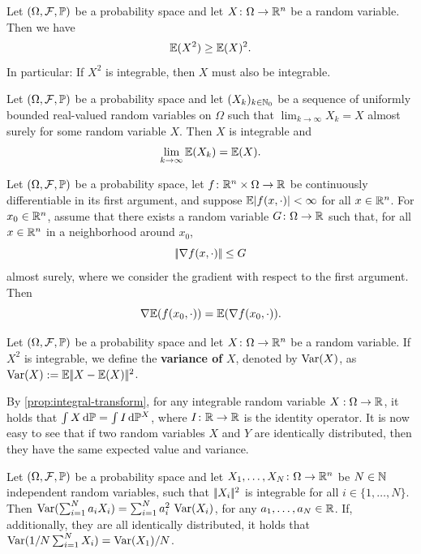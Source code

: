 \begin{proposition}
    \label{prop:jensens-inequality} 
    Let $(\Omega, \mathcal{F}, \mathbb{P})$ be a probability space and let $X\colon \Omega\to\mathbb{R}^n$
    be a random variable. Then we have
    \[
        \mathbb{E}(X^2) \geq \mathbb{E}(X)^{2}.
    \]
    In particular: If $X^2$ is integrable, then $X$ must also be integrable.
\end{proposition}

\begin{proposition}
    \label{prop:bounded-convergence-theorem}
    Let $(\Omega, \mathcal{F}, \mathbb{P})$ be a probability space and let $(X_k)_{k\in\mathbb{N}_0}$ be a sequence
    of uniformly bounded real-valued random variables on $\Omega$ such that $\lim_{k\to\infty} X_k = X$
    almost surely for some random variable $X$. Then $X$ is integrable and
    \[
        \lim_{k\to\infty} \mathbb{E}(X_k) = \mathbb{E}(X).
    \]
\end{proposition}

\begin{proposition}
    \label{prop:interchange-gradient-and-expectation}
    Let $(\Omega, \mathcal{F}, \mathbb{P})$ be a probability space,
    let $f\colon\mathbb{R}^n\times\Omega\to\mathbb{R}$ be continuously differentiable in its first argument, and
    suppose $\mathbb{E}| f(x, \cdot) | < \infty$ for all $x\in\mathbb{R}^n$. For $x_0\in\mathbb{R}^n$,
    assume that there exists a random variable $G\colon\Omega\to\mathbb{R}$ such that,
    for all $x\in\mathbb{R}^n$ in a neighborhood around $x_0$,
    \[
        |\!|\nabla f(x, \cdot)|\!| \leq G
    \]
    almost surely, where we consider the gradient with respect
    to the first argument.
    Then
    \[
        \nabla \mathbb{E}(f(x_0, \cdot)) = \mathbb{E}(\nabla f(x_0, \cdot)).
    \]
\end{proposition}

\begin{definition}
    Let $(\Omega, \mathcal{F}, \mathbb{P})$ be a probability space and let $X\colon \Omega \to \mathbb{R}^n$ be a random variable.
    If $X^2$ is integrable, we define the \textbf{variance of} $X$, denoted by $\operatorname{Var}(X)$, as $\operatorname{Var}(X) := \mathbb{E}|\!|X-\mathbb{E}(X)|\!|^2$.
\end{definition}
By \cref{prop:integral-transform}, for any integrable random variable 
$X: \Omega\to\mathbb{R}$, it holds that $\int X \,\textnormal{d}\mathbb{P} = \int I \,\textnormal{d}\mathbb{P}^X$, where $I\colon \mathbb{R}\to \mathbb{R}$ is the identity
operator. It is now easy to see that if two random variables $X$ and $Y$ are identically distributed,
then they have the same expected value and variance.
\begin{proposition}
    \label{prop:variance-linear-for-independent-rvs}
    Let $(\Omega, \mathcal{F}, \mathbb{P})$ be a probability space and let $X_1,\dots,X_N\colon \Omega \to \mathbb{R}^n$
    be $N\in\mathbb{N}$ independent random variables, such that $|\!|X_i|\!|^2$ is integrable
    for all $i\in\{1,\dots, N\}$. Then $\operatorname{Var}(\sum_{i=1}^N a_i X_i) = \sum_{i=1}^{N} a_i^2\, \operatorname{Var}(X_i)$,
    for any $a_1,\dots, a_N\in\mathbb{R}$.
    If, additionally, they are all identically distributed, it holds that
    $\operatorname{Var}(1/N \sum_{i=1}^N X_i) = \operatorname{Var}(X_1)/N$.
\end{proposition}

